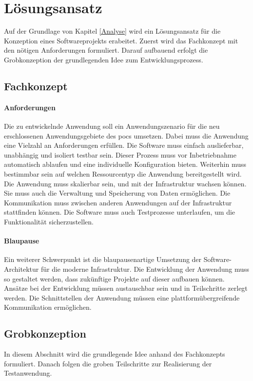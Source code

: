 \chapter{Lösungsansatz}
Auf der Grundlage von Kapitel \ref{Analyse} wird ein Lösungsansatz für die Konzeption eines Softwareprojekts erabeitet.
Zuerst wird das Fachkonzept mit den nötigen Anforderungen formuliert.
Darauf aufbauend erfolgt die Grobkonzeption der grundlegenden Idee zum Entwicklungsprozess.

\section{Fachkonzept}

\subsubsection{Anforderungen}
Die zu entwickelnde Anwendung soll ein Anwendungszenario für die neu erschlossenen Anwendungsgebiete des \ac{poc}s umsetzen.
Dabei muss die Anwendung eine Vielzahl an Anforderungen erfüllen.
Die Software muss einfach auslieferbar, unabhängig und isoliert testbar sein.
Dieser Prozess muss vor Inbetriebnahme automatisch ablaufen und eine individuelle Konfiguration bieten.
Weiterhin muss bestimmbar sein auf welchen Ressourcentyp die Anwendung bereitgestellt wird.
Die Anwendung muss skalierbar sein, und mit der Infrastruktur wachsen können.
Sie muss auch die Verwaltung und Speicherung von Daten ermöglichen.
Die Kommunikation muss zwischen anderen Anwendungen auf der Infrastruktur stattfinden können.
Die Software muss auch Testprozesse unterlaufen, um die Funktionalität sicherzustellen.


\subsubsection{Blaupause}
Ein weiterer Schwerpunkt ist die blaupausenartige Umsetzung der Software-Architek\-tur für die moderne Infrastruktur.
Die Entwicklung der Anwendung muss so gestaltet werden, dass zukünftige Projekte auf dieser aufbauen können.
Ansätze bei der Entwicklung müssen austauschbar sein und in Teilschritte zerlegt werden.
Die Schnittstellen der Anwendung müssen eine plattformübergreifende Kommunikation ermöglichen.


\section{Grobkonzeption}
In diesem Abschnitt wird die grundlegende Idee anhand des Fachkonzepts formuliert.
Danach folgen die groben Teilschritte zur Realisierung der Testanwendung.



